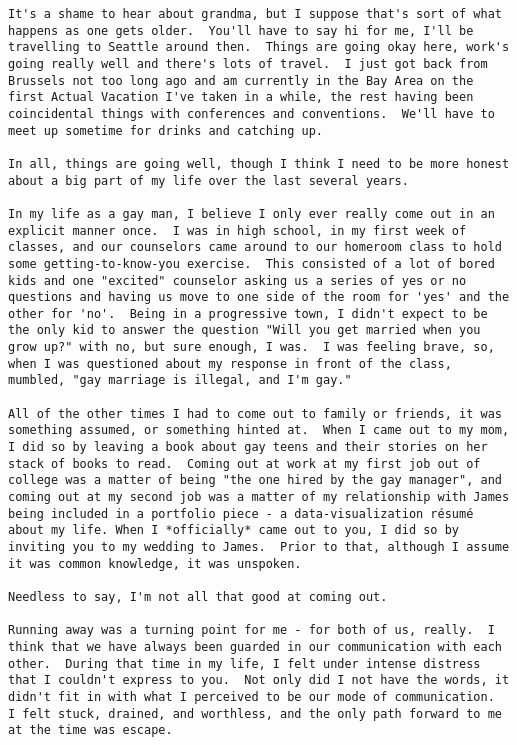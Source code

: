 \begin{paracol}{2}
\begin{leftcolumn}
\begin{verbatim}
It's a shame to hear about grandma, but I suppose that's sort of what happens as one gets older.  You'll have to say hi for me, I'll be travelling to Seattle around then.  Things are going okay here, work's going really well and there's lots of travel.  I just got back from Brussels not too long ago and am currently in the Bay Area on the first Actual Vacation I've taken in a while, the rest having been coincidental things with conferences and conventions.  We'll have to meet up sometime for drinks and catching up.

In all, things are going well, though I think I need to be more honest about a big part of my life over the last several years.

In my life as a gay man, I believe I only ever really come out in an explicit manner once.  I was in high school, in my first week of classes, and our counselors came around to our homeroom class to hold some getting-to-know-you exercise.  This consisted of a lot of bored kids and one "excited" counselor asking us a series of yes or no questions and having us move to one side of the room for 'yes' and the other for 'no'.  Being in a progressive town, I didn't expect to be the only kid to answer the question "Will you get married when you grow up?" with no, but sure enough, I was.  I was feeling brave, so, when I was questioned about my response in front of the class, mumbled, "gay marriage is illegal, and I'm gay."

All of the other times I had to come out to family or friends, it was something assumed, or something hinted at.  When I came out to my mom, I did so by leaving a book about gay teens and their stories on her stack of books to read.  Coming out at work at my first job out of college was a matter of being "the one hired by the gay manager", and coming out at my second job was a matter of my relationship with James being included in a portfolio piece - a data-visualization résumé about my life. When I *officially* came out to you, I did so by inviting you to my wedding to James.  Prior to that, although I assume it was common knowledge, it was unspoken.

Needless to say, I'm not all that good at coming out.

Running away was a turning point for me - for both of us, really.  I think that we have always been guarded in our communication with each other.  During that time in my life, I felt under intense distress that I couldn't express to you.  Not only did I not have the words, it didn't fit in with what I perceived to be our mode of communication.  I felt stuck, drained, and worthless, and the only path forward to me at the time was escape.


\end{verbatim}
\end{leftcolumn}
\end{paracol}
